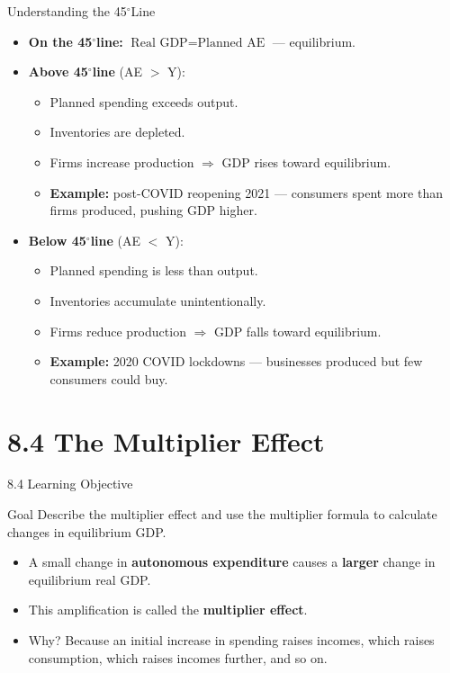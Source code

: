 \documentclass[aspectratio=169]{beamer}
\newcommand{\degree}{$^\circ$}
\begin{document}
\begin{frame}{Understanding the 45\degree Line}
\transfade
\begin{itemize}[<+->]
  \item \textbf{On the 45\degree line:} $\text{Real GDP} = \text{Planned AE}$ --- equilibrium.
  \item \textbf{Above 45\degree line} (AE $>$ Y):
  \begin{itemize}[<+->]
    \item Planned spending exceeds output.
    \item Inventories are depleted.
    \item Firms \alert{increase} production $\Rightarrow$ GDP rises toward equilibrium.
    \item \textbf{Example:} post-COVID reopening 2021 --- consumers spent more than firms produced, pushing GDP higher.
  \end{itemize}
  \item \textbf{Below 45\degree line} (AE $<$ Y):
  \begin{itemize}[<+->]
    \item Planned spending is less than output.
    \item Inventories accumulate unintentionally.
    \item Firms \alert{reduce} production $\Rightarrow$ GDP falls toward equilibrium.
    \item \textbf{Example:} 2020 COVID lockdowns --- businesses produced but few consumers could buy.
  \end{itemize}
\end{itemize}
\end{frame}

\section{8.4 The Multiplier Effect}

\begin{frame}{8.4 Learning Objective}
\transfade
\begin{block}{Goal}
Describe the multiplier effect and use the multiplier formula to calculate changes in equilibrium GDP.
\end{block}
\begin{itemize}[<+->]
  \item A small change in \textbf{autonomous expenditure} causes a \textbf{larger} change in equilibrium real GDP.
  \item This amplification is called the \textbf{multiplier effect}.
  \item Why? Because an initial increase in spending raises incomes, which raises consumption, which raises incomes further, and so on.
\end{itemize}
\end{frame}
\end{document}
